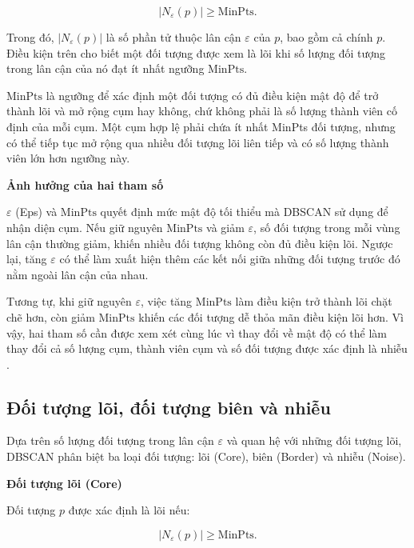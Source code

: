 \begin{equation}
    |N_{\varepsilon}(p)| \geq \mathrm{MinPts}.
\end{equation}

Trong đó, \(|N_{\varepsilon}(p)|\) là số phần tử thuộc lân cận \(\varepsilon\) của \(p\), bao gồm cả chính \(p\). Điều kiện trên cho biết một đối tượng được xem là lõi khi số lượng đối tượng trong lân cận của nó đạt ít nhất ngưỡng \(\mathrm{MinPts}\).

\(\mathrm{MinPts}\) là ngưỡng để xác định một đối tượng có đủ điều kiện mật độ để trở thành lõi và mở rộng cụm hay không, chứ không phải là số lượng thành viên cố định của mỗi cụm. Một cụm hợp lệ phải chứa ít nhất MinPts đối tượng, nhưng có thể tiếp tục mở rộng qua nhiều đối tượng lõi liên tiếp và có số lượng thành viên lớn hơn ngưỡng này.

\textbf{Ảnh hưởng của hai tham số}

\(\varepsilon\) (Eps) và \(\mathrm{MinPts}\) quyết định mức mật độ tối thiểu mà DBSCAN sử dụng để nhận diện cụm. Nếu giữ nguyên \(\mathrm{MinPts}\) và giảm \(\varepsilon\), số đối tượng trong mỗi vùng lân cận thường giảm, khiến nhiều đối tượng không còn đủ điều kiện lõi. Ngược lại, tăng \(\varepsilon\) có thể làm xuất hiện thêm các kết nối giữa những đối tượng trước đó nằm ngoài lân cận của nhau.

Tương tự, khi giữ nguyên \(\varepsilon\), việc tăng \(\mathrm{MinPts}\) làm điều kiện trở thành lõi chặt chẽ hơn, còn giảm \(\mathrm{MinPts}\) khiến các đối tượng dễ thỏa mãn điều kiện lõi hơn. Vì vậy, hai tham số cần được xem xét cùng lúc vì thay đổi về mật độ có thể làm thay đổi cả số lượng cụm, thành viên cụm và số đối tượng được xác định là nhiễu \parencite{ester1996dbscan}.

\subsection{Đối tượng lõi, đối tượng biên và nhiễu}

Dựa trên số lượng đối tượng trong lân cận \(\varepsilon\) và quan hệ với những đối tượng lõi, DBSCAN phân biệt ba loại đối tượng: lõi (Core), biên (Border) và nhiễu (Noise).

\textbf{Đối tượng lõi (Core)}

Đối tượng \(p\) được xác định là lõi nếu:

\begin{equation}
    |N_{\varepsilon}(p)| \geq \mathrm{MinPts}.
\end{equation}

